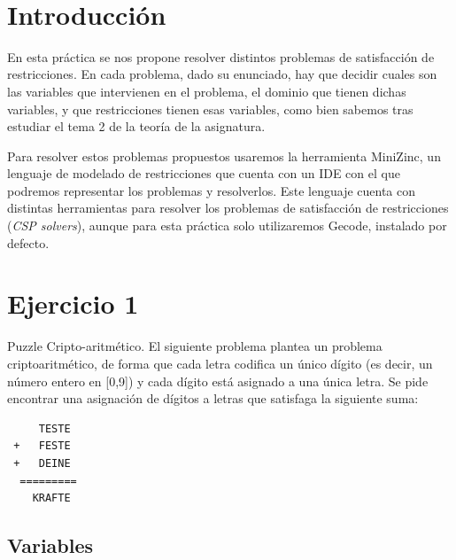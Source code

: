 \documentclass[11pt, spanish]{article}
\makeatletter
\let\thedate\@date
\makeatother
\begin{document}
\begin{titlepage}
    {\large \thedate}\\[0.5cm]
    {\doclicenseThis}
 	
    \vfill
    
\end{titlepage}




\section*{Introducción}

En esta práctica se nos propone resolver distintos problemas de satisfacción de restricciones. En cada problema, dado su enunciado, hay que decidir cuales son las variables que intervienen en el problema, el dominio que tienen dichas variables, y que restricciones tienen esas variables, como bien sabemos tras estudiar el tema 2 de la teoría de la asignatura.

Para resolver estos problemas propuestos usaremos la herramienta MiniZinc, un lenguaje de modelado de restricciones que cuenta con un IDE con el que podremos representar los problemas y resolverlos. Este lenguaje cuenta con distintas herramientas para resolver los problemas de satisfacción de restricciones (\textit{CSP solvers}), aunque para esta práctica solo utilizaremos Gecode, instalado por defecto.

\section{Ejercicio 1}

Puzzle Cripto-aritmético. El siguiente problema plantea un problema criptoaritmético, de forma que cada letra codifica un único dígito (es decir, un número entero en [0,9]) y cada dígito está asignado a una única letra. Se pide encontrar una asignación de dígitos a letras que satisfaga la siguiente suma:

\begin{lstlisting}
     TESTE
 +   FESTE
 +   DEINE
  =========
    KRAFTE
\end{lstlisting}

\subsection{Variables}
\end{document}
